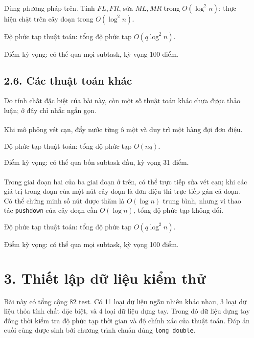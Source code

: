 \documentclass[11pt]{article}
\begin{document}
\paragraph{}
Dùng phương pháp trên. Tính \(FL,FR\), sửa \(ML,MR\) trong \(O(\log^2 n)\);
thực hiện chặt trên cây đoạn trong \(O(\log^2 n)\).

Độ phức tạp thuật toán: tổng độ phức tạp \(O(q\log^2 n)\).

Điểm kỳ vọng: có thể qua mọi subtask, kỳ vọng 100 điểm.

\subsection*{2.6. Các thuật toán khác}

Do tính chất đặc biệt của bài này, còn một số thuật toán khác chưa được thảo
luận; ở đây chỉ nhắc ngắn gọn.

\paragraph{}
Khi mô phỏng vét cạn, đẩy nước từng ô một và duy trì một hàng đợi đơn điệu.

Độ phức tạp thuật toán: tổng độ phức tạp \(O(nq)\).

Điểm kỳ vọng: có thể qua bốn subtask đầu, kỳ vọng 31 điểm.

\paragraph{}
Trong giai đoạn hai của ba giai đoạn ở trên, có thể trực tiếp sửa vét cạn;
khi các giá trị trong đoạn của một nút cây đoạn là đơn điệu thì trực tiếp gán
cả đoạn. Có thể chứng minh số nút được thăm là \(O(\log n)\) trung bình,
nhưng vì thao tác \texttt{pushdown} của cây đoạn cần \(O(\log n)\), tổng độ
phức tạp không đổi.

Độ phức tạp thuật toán: tổng độ phức tạp \(O(q\log^2 n)\).

Điểm kỳ vọng: có thể qua mọi subtask, kỳ vọng 100 điểm.

\section*{3. Thiết lập dữ liệu kiểm thử}

Bài này có tổng cộng 82 test. Có 11 loại dữ liệu ngẫu nhiên khác nhau, 3 loại
dữ liệu thỏa tính chất đặc biệt, và 4 loại dữ liệu dựng tay. Trong đó dữ liệu
dựng tay đồng thời kiểm tra độ phức tạp thời gian và độ chính xác của thuật
toán. Đáp án cuối cùng được sinh bởi chương trình chuẩn dùng \texttt{long
double}.
\end{document}
